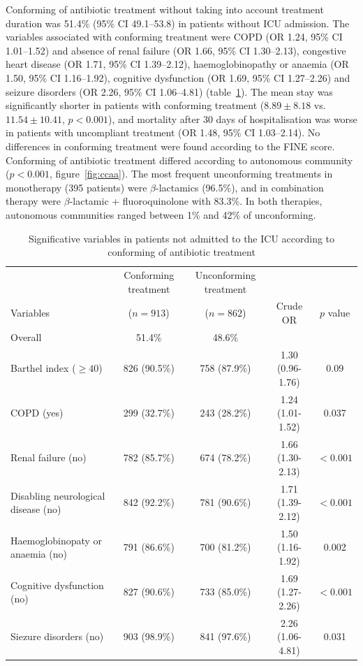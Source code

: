 \documentclass[11pt, a4paper]{article}
\begin{document}
\begin{multicols}{2}
Conforming of antibiotic treatment without taking into account treatment duration was 51.4\% (95\% CI 49.1–53.8) in patients without ICU admission. The variables associated with conforming treatment were COPD (OR 1.24, 95\% CI 1.01–1.52) and absence of renal failure (OR 1.66, 95\% CI 1.30–2.13), congestive heart disease (OR 1.71, 95\% CI 1.39–2.12), haemoglobinopathy or anaemia (OR 1.50, 95\% CI 1.16–1.92), cognitive dysfunction (OR 1.69, 95\% CI 1.27–2.26) and seizure disorders (OR 2.26, 95\% CI 1.06–4.81) (table~\ref{tab:tabla_nouci}). The mean stay was significantly shorter in patients with conforming treatment ($8.89 \pm 8.18$ vs. $11.54 \pm 10.41$, $p < 0.001$), and mortality after 30 days of hospitalisation was worse in patients with uncompliant treatment (OR 1.48, 95\% CI 1.03–2.14). No differences in conforming treatment were found according to the FINE score. Conforming of antibiotic treatment differed according to autonomous community ($p < 0.001$, figure~\ref{fig:ccaa}). The most frequent unconforming treatments in monotherapy (395 patients) were $\beta$-lactamics (96.5\%), and in combination therapy were $\beta$-lactamic + fluoroquinolone with 83.3\%. In both therapies, autonomous communities ranged between 1\% and 42\% of unconforming.

\end{multicols}

\begin{table}[hbt!]
\centering
\scalebox{0.85}
{
\begin{tabular}{lcccc}
\hline
& Conforming treatment & Unconforming treatment & & \\
Variables & ($n=913$) & ($n=862$) & Crude OR & $p$ value \\
\hline
Overall
& 51.4\%
& 48.6\%
& & \\
Barthel index ($\geq40$) 
& 826 (90.5\%)
& 758 (87.9\%) 
& 1.30 (0.96-1.76)
& 0.09 \\
COPD (yes)
& 299 (32.7\%)
& 243 (28.2\%) 
& 1.24 (1.01-1.52)
& 0.037 \\
Renal failure (no)
& 782 (85.7\%)
& 674 (78.2\%)
& 1.66 (1.30-2.13)
& $<0.001$ \\
Disabling neurological disease (no) 
& 842 (92.2\%)
& 781 (90.6\%)
& 1.71 (1.39-2.12)
& $<0.001$ \\
Haemoglobinopaty or anaemia (no)
& 791 (86.6\%) 
& 700 (81.2\%)
& 1.50 (1.16-1.92)
& 0.002 \\
Cognitive dysfunction (no)
& 827 (90.6\%)
& 733 (85.0\%)
& 1.69 (1.27-2.26)
& $<0.001$ \\
Siezure disorders (no)
& 903 (98.9\%)
& 841 (97.6\%)
& 2.26 (1.06-4.81)
& 0.031\\
\hline
\end{tabular}
}
\caption{\footnotesize Significative variables in patients not admitted to the ICU according to conforming of antibiotic treatment}
\label{tab:tabla_nouci}
\end{table}
\end{document}
